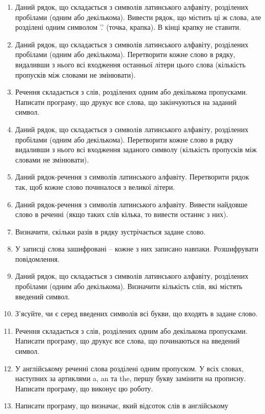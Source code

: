 \documentclass[]{article}
\makeatletter
\newcommand{\xslalph}[1]{\expandafter\@xslalph\csname c@#1\endcsname}
\newcommand{\@xslalph}[1]{%
    \ifcase#1\or а\or б\or в\or г\or д\or e\or є\or ж\or з\or i%
    \or й\or к\or л\or м\or н\or о\or п\or р\or с\or т%
    \or у\or ф\or х\or ц\or ч\or ш\or ю\or я\or аа\or бб\or вв%
    \else\@ctrerr\fi%
}
\makeatother
\begin{document}
\begin{enumerate}
\begin{enumerate}[label=\xslalph*)]
\begin{enumerate}
\begin{enumerate}[label=\xslalph*)]
\begin{enumerate}
\def\labelenumi{\arabic{enumi})}
\item
  Даний рядок, що складається з символів латинського алфавіту,
  розділених пробілами (одним або декількома). Вивести рядок, що містить
  ці ж слова, але розділені одним символом '.' (точка, крапка). В кінці
  крапку не ставити.
\item
  Даний рядок, що складається з символів латинського алфавіту,
  розділених пробілами (одним або декількома). Перетворити кожне слово в
  рядку, видаливши з нього всі входження останньої літери цього слова
  (кількість пропусків між словами не змінювати).
\item
  Речення складається з слів, розділених одним або декількома
  пропусками. Написати програму, що друкує все слова, що закінчуються на
  заданий символ.
\item
  Даний рядок, що складається з символів латинського алфавіту,
  розділених пробілами (одним або декількома). Перетворити кожне слово в
  рядку видаливши з нього всі входження заданого символу (кількість
  пропусків між словами не змінювати).
\item
  Даний рядок-речення з символів латинського алфавіту. Перетворити рядок
  так, щоб кожне слово починалося з великої літери.
\item
  Даний рядок-речення з символів латинського алфавіту. Вивести найдовше
  слово в реченні (якщо таких слів кілька, то вивести останнє з них).
\item
  Визначити, скільки разів в рядку зустрічається задане слово.
\item
  У записці слова зашифровані -- кожне з них записано навпаки. Розшифрувати повідомлення.
\item
  Даний рядок, що складається з символів латинського алфавіту,
  розділених пробілами (одним або декількома). Визначити кількість слів,
  які містять введений символ.
\item
  З'ясуйте, чи є серед введених символів всі букви, що входять в задане
  слово.
\item
  Речення складається з слів, розділених одним або декількома
  пропусками. Написати програму, що друкує все слова, що починаються на
  введений символ.
\item
  У англійському реченні слова розділені одним пропуском. У всіх словах,
  наступних за артиклями a, an та the, першу букву замінити на прописну.
  Написати програму, що виконує цю роботу.
\item
  Написати програму, що визначає, який відсоток слів в англійському

\end{enumerate}
\end{enumerate}
\end{enumerate}
\end{enumerate}
\end{enumerate}
\end{document}
